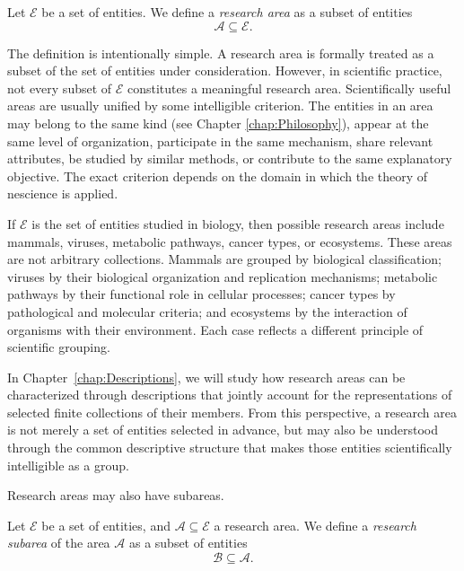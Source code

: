 \begin{definition}
Let $\mathcal{E}$ be a set of entities. We define a \emph{research area} as a subset of entities
\[
\mathcal{A} \subseteq \mathcal{E}.
\]
\end{definition}

The definition is intentionally simple. A research area is formally treated as a subset of the set of entities under consideration. However, in scientific practice, not every subset of $\mathcal{E}$ constitutes a meaningful research area. Scientifically useful areas are usually unified by some intelligible criterion. The entities in an area may belong to the same kind (see Chapter \ref{chap:Philosophy}), appear at the same level of organization, participate in the same mechanism, share relevant attributes, be studied by similar methods, or contribute to the same explanatory objective. The exact criterion depends on the domain in which the theory of nescience is applied.

\begin{example}
If $\mathcal{E}$ is the set of entities studied in biology, then possible research areas include mammals, viruses, metabolic pathways, cancer types, or ecosystems. These areas are not arbitrary collections. Mammals are grouped by biological classification; viruses by their biological organization and replication mechanisms; metabolic pathways by their functional role in cellular processes; cancer types by pathological and molecular criteria; and ecosystems by the interaction of organisms with their environment. Each case reflects a different principle of scientific grouping.
\end{example}

In Chapter~\ref{chap:Descriptions}, we will study how research areas can be characterized through descriptions that jointly account for the representations of selected finite collections of their members. From this perspective, a research area is not merely a set of entities selected in advance, but may also be understood through the common descriptive structure that makes those entities scientifically intelligible as a group.

Research areas may also have subareas.

\begin{definition}
Let $\mathcal{E}$ be a set of entities, and $\mathcal{A} \subseteq \mathcal{E}$ a research area. We define a \emph{research subarea} of the area $\mathcal{A}$ as a subset of entities
\[
\mathcal{B} \subseteq \mathcal{A}.
\]
\end{definition}

